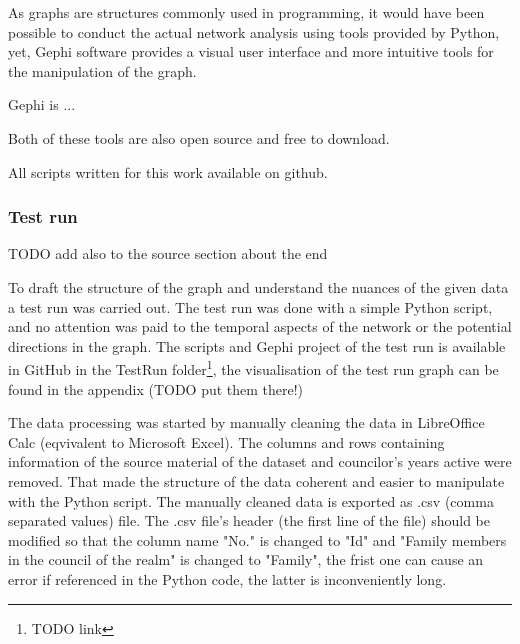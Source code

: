 \documentclass[a4paper,12pt]{article}
\begin{document}
As graphs are structures commonly used in programming, it would have been possible to conduct the actual network analysis using tools provided by Python, yet, Gephi software provides a visual user interface and more intuitive tools for the manipulation of the graph.

Gephi is ...

Both of these tools are also open source and free to download.

All scripts written for this work available on github.



\subsubsection{Test run}
TODO add also to the source section about the end

To draft the structure of the graph and understand the nuances of the given data a test run was carried out. The test run was done with a simple Python script, and no attention was paid to the temporal aspects of the network or the potential directions in the graph. The scripts and Gephi project of the test run is available in GitHub in the TestRun folder\footnote{TODO link}, the visualisation of the test run graph can be found in the appendix (TODO put them there!)

The data processing was started by manually cleaning the data in LibreOffice Calc (eqvivalent to Microsoft Excel). The columns and rows containing information of the source material of the dataset and councilor's years active were removed. That made the structure of the data coherent and easier to manipulate with the Python script. The manually cleaned data is exported as .csv (comma separated values) file. The .csv file's header (the first line of the file) should be modified so that the column name "No." is changed to "Id" and "Family members in the council of the realm" is changed to "Family", the frist one can cause an error if referenced in the Python code, the latter is inconveniently long. 

\begin{table}[h]
	\caption{Example of the raw .csv file}
\end{table}
\end{document}
